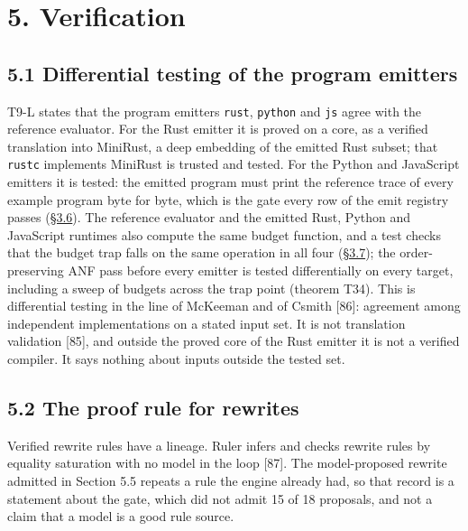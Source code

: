 \documentclass[10pt,letterpaper]{article}
\begin{document}
\section{5. Verification}\label{verification}

\subsection{5.1 Differential testing of the program
emitters}\label{differential-testing-of-the-program-emitters}

T9-L states that the program emitters \texttt{rust}, \texttt{python} and
\texttt{js} agree with the reference evaluator. For the Rust emitter it
is proved on a core, as a verified translation into MiniRust, a deep
embedding of the emitted Rust subset; that \texttt{rustc} implements
MiniRust is trusted and tested. For the Python and JavaScript emitters
it is tested: the emitted program must print the reference trace of
every example program byte for byte, which is the gate every row of the
emit registry passes
(\href{https://research.openie.dev/papers/rce/\#36-one-ecosystem-lossless-and-the-universality-thesis}{§3.6}).
The reference evaluator and the emitted Rust, Python and JavaScript
runtimes also compute the same budget function, and a test checks that
the budget trap falls on the same operation in all four
(\href{https://research.openie.dev/papers/rce/\#37-the-language-one-text-costs-and-theorem-status}{§3.7});
the order-preserving ANF pass before every emitter is tested
differentially on every target, including a sweep of budgets across the
trap point (theorem T34). This is differential testing in the line of
McKeeman and of Csmith {[}86{]}: agreement among independent
implementations on a stated input set. It is not translation validation
{[}85{]}, and outside the proved core of the Rust emitter it is not a
verified compiler. It says nothing about inputs outside the tested set.

\subsection{5.2 The proof rule for
rewrites}\label{the-proof-rule-for-rewrites}

Verified rewrite rules have a lineage. Ruler infers and checks rewrite
rules by equality saturation with no model in the loop {[}87{]}. The
model-proposed rewrite admitted in Section 5.5 repeats a rule the engine
already had, so that record is a statement about the gate, which did not
admit 15 of 18 proposals, and not a claim that a model is a good rule
source.
\end{document}
